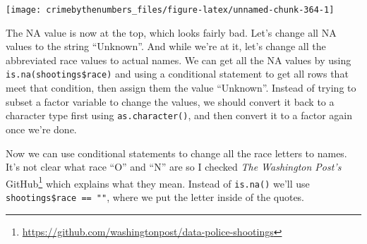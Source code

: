 \documentclass[
]{krantz}
\makeatletter
\newenvironment{Shaded}{\begin{snugshade}}{\end{snugshade}}
\newcommand{\FunctionTok}[1]{\textcolor[rgb]{0,0,0}{#1}}
\newcommand{\NormalTok}[1]{#1}
\newcommand{\OtherTok}[1]{\textcolor[rgb]{0.37,0.37,0.37}{#1}}
\newcommand{\SpecialCharTok}[1]{\textcolor[rgb]{0,0,0}{#1}}
\newcommand{\StringTok}[1]{\textcolor[rgb]{0.5,0.5,0.5}{#1}}
\renewcommand{\href}[2]{#2\footnote{\url{#1}}}
\newenvironment{kframe}{%
\medskip{}
\setlength{\fboxsep}{.8em}
 \def\at@end@of@kframe{}%
 \ifinner\ifhmode%
  \def\at@end@of@kframe{\end{minipage}}%
  \begin{minipage}{\columnwidth}%
 \fi\fi%
 \def\FrameCommand##1{\hskip\@totalleftmargin \hskip-\fboxsep
 \colorbox{shadecolor}{##1}\hskip-\fboxsep
     \hskip-\linewidth \hskip-\@totalleftmargin \hskip\columnwidth}%
 \MakeFramed {\advance\hsize-\width
   \@totalleftmargin\z@ \linewidth\hsize
   \@setminipage}}%
 {\par\unskip\endMakeFramed%
 \at@end@of@kframe}
\renewenvironment{Shaded}{\begin{kframe}}{\end{kframe}}
\makeatother
\begin{document}
\begin{center}\texttt{[image: crimebythenumbers\_files/figure-latex/unnamed-chunk-364-1]} \end{center}

The NA value is now at the top, which looks fairly bad.
Let's change all NA values to the string ``Unknown''. And
while we're at it, let's change all the abbreviated race
values to actual names. We can get all the NA values by
using \texttt{is.na(shootings\$race)} and using a
conditional statement to get all rows that meet that
condition, then assign them the value ``Unknown''. Instead
of trying to subset a factor variable to change the values,
we should convert it back to a character type first using
\texttt{as.character()}, and then convert it to a factor
again once we're done.

\begin{Shaded}
\end{Shaded}

Now we can use conditional statements to change all the race
letters to names. It's not clear what race ``O'' and ``N''
are so I checked
\href{https://github.com/washingtonpost/data-police-shootings}{\emph{The
Washington Post's} GitHub} which explains what they mean.
Instead of \texttt{is.na()} we'll use
\texttt{shootings\$race\ ==\ ""}, where we put the letter
inside of the quotes.

\begin{Shaded}
\end{Shaded}
\end{document}
